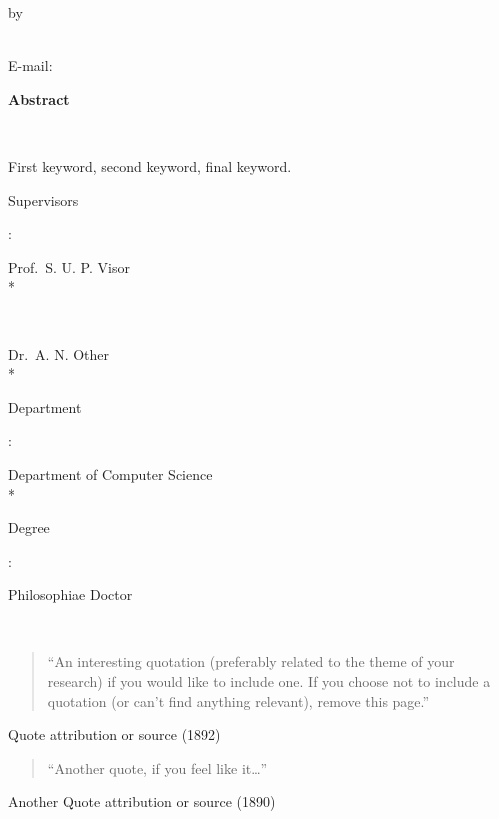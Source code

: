 
\newpage

\begin{center}
	{\large\bf {}}
\end{center}
\begin{center}by\end{center}
\begin{center}
	{}\\
		E-mail: \href{mailto:}{\directlua{value(email)}}
\end{center}
\vspace{1cm}
\begin{center}{\large\bf Abstract}\end{center}
\noindent\

 First keyword, second keyword, final keyword.

\vfill
\noindent
{\bf\parbox{26.8mm}{Supervisors}:} Prof.~S. U. P. Visor \\* %
{\bf\parbox{28.55mm}{~}} Dr.~A. N. Other \\*
{\bf\parbox{26.8mm}{Department}:} Department of Computer Science \\*
{\bf\parbox{26.8mm}{Degree}:} Philosophiae Doctor


\newpage

\ 

\begin{quotation}
``An interesting quotation (preferably related to the theme of your research) if you would like to include one. If you choose not to include a quotation (or can't find anything relevant), remove this page.''
\end{quotation}
\begin{flushright}
Quote attribution or source (1892)
\end{flushright}

\vspace{1cm}

\begin{quotation}
``Another quote, if you feel like it\ldots''
\end{quotation}
\begin{flushright}
Another Quote attribution or source (1890)
\end{flushright}


